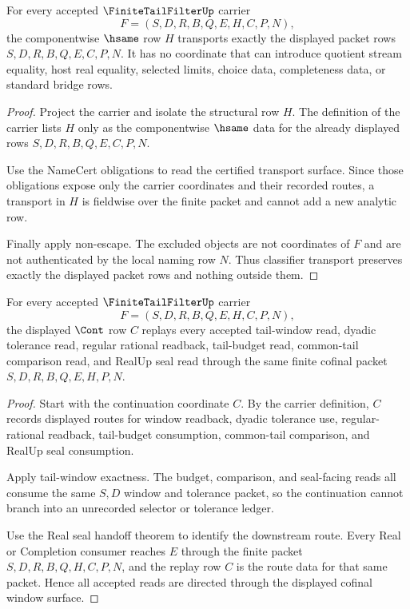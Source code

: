 \begin{theorem}
\label{thm:finite-tail-filter-carrier-transport-obligation}
For every accepted $\FiniteTailFilterUp$ carrier
$$
F=(S,D,R,B,Q,E,H,C,P,N),
$$
the componentwise $\hsame$ row $H$ transports exactly the displayed packet rows $S,D,R,B,Q,E,C,P,N$. It has no coordinate that can introduce quotient stream equality, host real equality, selected limits, choice data, completeness data, or standard bridge rows.
\end{theorem}
\begin{proof}
Project the carrier and isolate the structural row $H$. The definition of the carrier lists $H$ only as the componentwise $\hsame$ data for the already displayed rows $S,D,R,B,Q,E,C,P,N$.

Use the NameCert obligations to read the certified transport surface. Since those obligations expose only the carrier coordinates and their recorded routes, a transport in $H$ is fieldwise over the finite packet and cannot add a new analytic row.

Finally apply non-escape. The excluded objects are not coordinates of $F$ and are not authenticated by the local naming row $N$. Thus classifier transport preserves exactly the displayed packet rows and nothing outside them.
\end{proof}

\begin{theorem}
\label{thm:finite-tail-filter-cofinal-window-directedness-obligation}
For every accepted $\FiniteTailFilterUp$ carrier
$$
F=(S,D,R,B,Q,E,H,C,P,N),
$$
the displayed $\Cont$ row $C$ replays every accepted tail-window read, dyadic tolerance read, regular rational readback, tail-budget read, common-tail comparison read, and RealUp seal read through the same finite cofinal packet $S,D,R,B,Q,E,H,P,N$.
\end{theorem}
\begin{proof}
Start with the continuation coordinate $C$. By the carrier definition, $C$ records displayed routes for window readback, dyadic tolerance use, regular-rational readback, tail-budget consumption, common-tail comparison, and RealUp seal consumption.

Apply tail-window exactness. The budget, comparison, and seal-facing reads all consume the same $S,D$ window and tolerance packet, so the continuation cannot branch into an unrecorded selector or tolerance ledger.

Use the Real seal handoff theorem to identify the downstream route. Every Real or Completion consumer reaches $E$ through the finite packet $S,D,R,B,Q,H,C,P,N$, and the replay row $C$ is the route data for that same packet. Hence all accepted reads are directed through the displayed cofinal window surface.
\end{proof}

